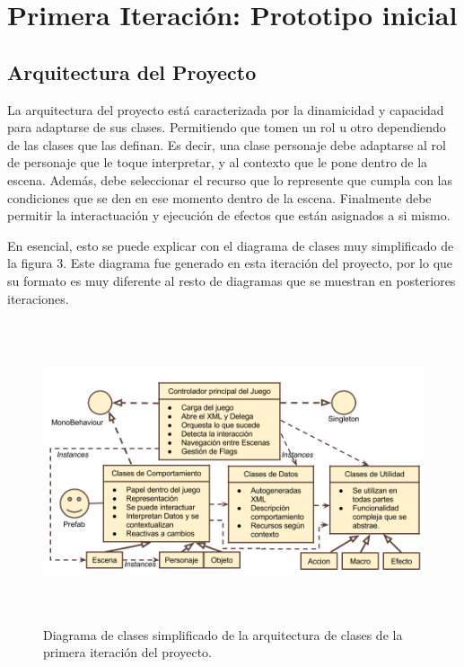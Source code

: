 \chapter{Primera Iteración: Prototipo inicial}
\label{primeraiteracion}

\section{Arquitectura del Proyecto}
\label{it1arquitectura}
La arquitectura del proyecto está caracterizada por la dinamicidad y capacidad para adaptarse de sus clases. Permitiendo que tomen un rol u otro dependiendo de las clases que las definan. Es decir, una clase personaje debe adaptarse al rol de personaje que le toque interpretar, y al contexto que le pone dentro de la escena. Además, debe seleccionar el recurso que lo represente que cumpla con las condiciones que se den en ese momento dentro de la escena. Finalmente debe permitir la interactuación y ejecución de efectos que están asignados a si mismo.

En esencial, esto se puede explicar con el diagrama de clases muy simplificado de la figura 3. Este diagrama fue generado en esta iteración del proyecto, por lo que su formato es muy diferente al resto de diagramas que se muestran en posteriores iteraciones.

\begin{figure}[htb]
	\includegraphics[height=3.5in]{figures/arquitecturait1.png}
	\caption[Arquitectura simplificada - Prototipo 1]{Diagrama de clases simplificado de la arquitectura de clases de la primera iteración del proyecto.}
	\label{arquitecturait1}
\end{figure}

